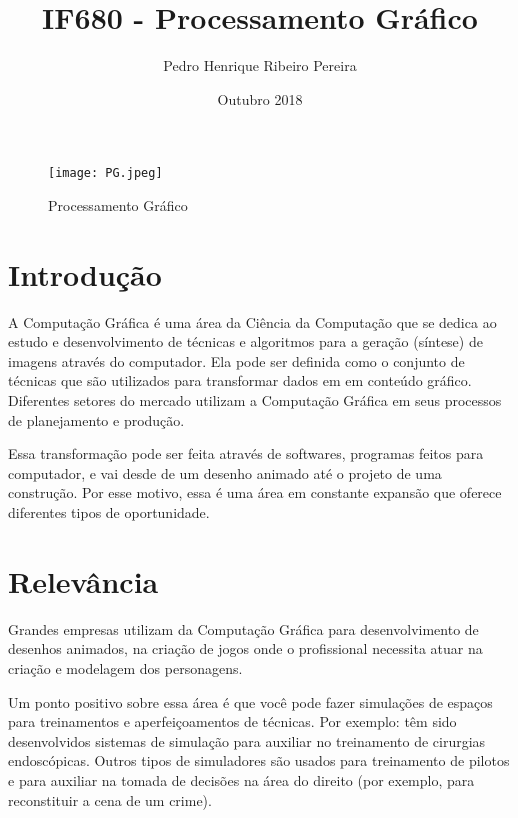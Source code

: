 \documentclass[10pt]{article}
\title{IF680 - Processamento Gráfico}
\author{Pedro Henrique Ribeiro Pereira}
\date{Outubro 2018}
\begin{document}
\maketitle

\begin{figure}[h!]
\centering
\texttt{[image: PG.jpeg]}
\caption{Processamento Gráfico}
\end{figure}

\section{Introdução}
A Computação Gráfica é uma área da Ciência da Computação que se dedica
ao estudo e desenvolvimento de técnicas e algoritmos para a geração (síntese) de imagens
através do computador. Ela pode ser definida como o conjunto de técnicas que são utilizados para transformar dados em em conteúdo gráfico. Diferentes setores do mercado utilizam a Computação Gráfica em seus processos de planejamento e produção. 

Essa transformação pode ser feita através de softwares, programas feitos para computador, e vai desde de um desenho animado até o projeto de uma construção. Por esse motivo, essa é uma área em constante expansão que oferece diferentes tipos de oportunidade.
\citep{NEWS}

\section{Relevância}
Grandes empresas utilizam da Computação Gráfica para desenvolvimento de desenhos animados, na criação de jogos onde o profissional necessita atuar na criação e modelagem dos personagens.

Um ponto positivo sobre essa área é que você pode fazer simulações de espaços para treinamentos e aperfeiçoamentos de técnicas. Por exemplo: têm sido desenvolvidos sistemas de simulação para auxiliar no
treinamento de cirurgias endoscópicas. Outros tipos de simuladores são usados para treinamento
de pilotos e para auxiliar na tomada de decisões na área do direito (por exemplo, para
reconstituir a cena de um crime).

\citep{PUCRS}
\end{document}
